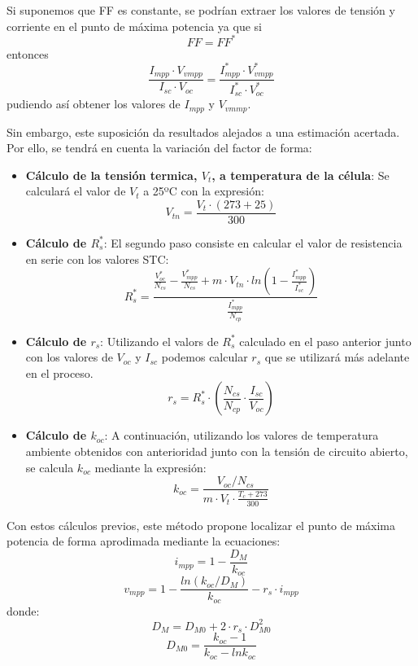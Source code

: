 Si suponemos que FF es constante, se podrían extraer los valores de tensión y corriente en el punto de máxima potencia ya que si
\begin{equation}
FF=FF^*
\end{equation}
entonces
\begin{equation}
\frac{I_{mpp}\cdot V_{vmpp}}{I_{sc}\cdot V_{oc}}=\frac{I_{mpp}^*\cdot V_{vmpp}^*}{I_{sc}^*\cdot V_{oc}^*}
\end{equation}
pudiendo así obtener los valores de \(I_{mpp}\) y \(V_{vmmp}\).

Sin embargo, este suposición da resultados alejados a una estimación acertada. Por ello, se tendrá en cuenta la variación del factor de forma:
\begin{itemize}
\item \textbf{Cálculo de la tensión termica, \(V_t\), a temperatura de la célula}: Se calculará el valor de \(V_t\) a 25ºC con la expresión:
\begin{equation}
V_{tn}=\frac{V_t\cdot (273+25)}{300}
\end{equation}
\item \textbf{Cálculo de \(R_s^*\)}: El segundo paso consiste en calcular el valor de resistencia en serie con los valores STC:
\begin{equation}
R_s^*=\frac{\frac{V_{oc}^*}{N_{cs}}-\frac{V_{mpp}^*}{N_{cs}}+m\cdot V_{tn}\cdot ln(1-\frac{I_{mpp}^*}{I_{sc}^*})}{\frac{I_{mpp}^*}{N_{cp}}}
\end{equation}
\item \textbf{Cálculo de \(r_s\)}: Utilizando el valors de \(R_s^*\) calculado en el paso anterior junto con los valores de \(V_{oc}\) y \(I_{sc}\) podemos calcular \(r_s\) que se utilizará más adelante en el proceso.
\begin{equation}
r_s=R_s^*\cdot (\frac{N_{cs}}{N_{cp}}\cdot \frac{I_{sc}}{V_{oc}})
\end{equation}
\item \textbf{Cálculo de \(k_{oc}\)}: A continuación, utilizando los valores de temperatura ambiente obtenidos con anterioridad junto con la tensión de circuito abierto, se calcula \(k_{oc}\) mediante la expresión:
\begin{equation}
k_{oc}=\frac{V_{oc}/N_{cs}}{m\cdot V_t \cdot \frac{T_c+273}{300}}
\end{equation}
\end{itemize}

Con estos cálculos previos, este método propone localizar el punto de máxima potencia de forma aprodimada mediante la ecuaciones:
\begin{equation}
i_{mpp}=1-\frac{D_M}{k_{oc}}
\end{equation}
\begin{equation}
v_{mpp}=1-\frac{ln(k_{oc}/D_M)}{k_{oc}}-r_s\cdot i_{mpp}
\end{equation}
donde:
\begin{equation}
D_M=D_{M0}+2\cdot r_s\cdot D_{M0}^2
\end{equation}
\begin{equation}
D_{M0}=\frac{k_{oc}-1}{k_{oc}-lnk_{oc}}
\end{equation}

